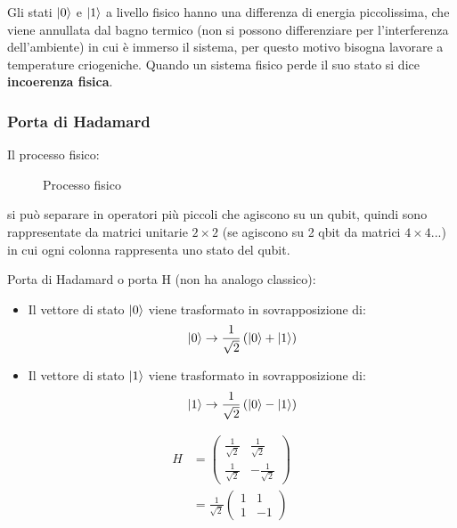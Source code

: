 \documentclass[a4paper]{article}
\begin{document}
\vspace{1em}
\noindent
Gli stati \( \ket{0} \) e \( \ket{1} \) a livello fisico hanno una differenza di energia
piccolissima, che viene annullata dal bagno termico (non si possono differenziare per
l'interferenza dell'ambiente) in cui è immerso il sistema, per
questo motivo bisogna lavorare a temperature criogeniche.
Quando un sistema fisico perde il suo stato si dice \textbf{incoerenza fisica}.

\subsubsection{Porta di Hadamard}
Il processo fisico:
\begin{figure}[H]
  \centering
  \caption{Processo fisico}
\end{figure}
\noindent
si può separare in operatori più piccoli che agiscono su un qubit, quindi sono rappresentate
da matrici unitarie \( 2 \times 2 \) (se agiscono su 2 qbit da matrici \( 4 \times 4 \)...)
in cui ogni colonna rappresenta uno stato del qubit.

\vspace{1em}
\noindent
Porta di Hadamard o porta H (non ha analogo classico):
\begin{itemize}
  \item 
    Il vettore di stato \( \ket{0} \) viene trasformato in sovrapposizione di:
    \[
      \ket{0} \to \frac{1}{\sqrt{2}} \left( \ket{0} + \ket{1} \right)
    \] 
  \item 
    Il vettore di stato \( \ket{1} \) viene trasformato in sovrapposizione di:
    \[
      \ket{1} \to \frac{1}{\sqrt{2}} \left( \ket{0} - \ket{1} \right)
    \]
\end{itemize}
\[
  \begin{aligned}
    H &= \begin{pmatrix} 
      \frac{1}{\sqrt{2}} & \frac{1}{\sqrt{2}}\\
      \frac{1}{\sqrt{2}} & -\frac{1}{\sqrt{2}}
    \end{pmatrix} \\
      &= \frac{1}{\sqrt{2}} \begin{pmatrix} 
        1 & 1\\
        1 & -1
      \end{pmatrix} 
  \end{aligned}
\] 
\end{document}
